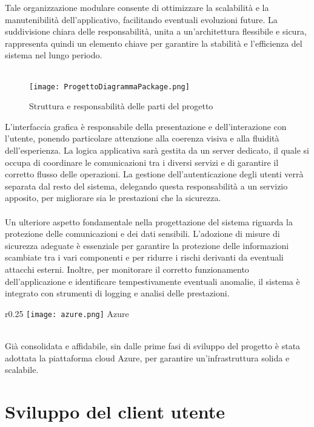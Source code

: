 Tale organizzazione modulare consente di ottimizzare 
la scalabilità e la manutenibilità dell'applicativo,
facilitando eventuali evoluzioni future.
La suddivisione chiara delle responsabilità, unita a un'architettura flessibile e sicura,
rappresenta quindi un elemento chiave per garantire 
la stabilità e l'efficienza del sistema nel lungo periodo.\\
\\
\begin{figure}[htb]
    \centering
    \texttt{[image: ProgettoDiagrammaPackage.png]}
    \caption{Struttura e responsabilità delle parti del progetto}
\end{figure}
\clearpage
L'interfaccia grafica è responsabile della presentazione e dell'interazione con l'utente,
ponendo particolare attenzione alla coerenza visiva e alla fluidità dell'esperienza.
La logica applicativa sarà gestita da un server dedicato,
il quale si occupa di coordinare le comunicazioni tra i diversi servizi
e di garantire il corretto flusso delle operazioni.
La gestione dell'autenticazione degli utenti verrà separata dal resto del sistema,
delegando questa responsabilità a un servizio apposito,
per migliorare sia le prestazioni che la sicurezza.\\
\\
Un ulteriore aspetto fondamentale nella progettazione del sistema riguarda
la protezione delle comunicazioni e dei dati sensibili.
L'adozione di misure di sicurezza adeguate è essenziale
per garantire la protezione delle informazioni scambiate tra i vari componenti e
per ridurre i rischi derivanti da eventuali attacchi esterni.
Inoltre, per monitorare il corretto funzionamento dell'applicazione e
identificare tempestivamente eventuali anomalie,
il sistema è integrato con strumenti di logging e analisi delle prestazioni.
\begin{wrapfigure}{r}{0.25\textwidth}
    \centering
    \texttt{[image: azure.png]}
    Azure
\end{wrapfigure}
\\
Già consolidata e affidabile,
sin dalle prime fasi di sviluppo del progetto è stata adottata la piattaforma cloud Azure,
per garantire un'infrastruttura solida e scalabile.\\
\clearpage
\section{Sviluppo del client utente}

